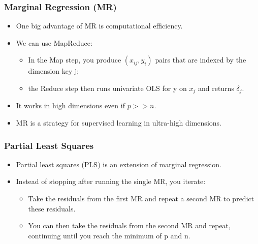 \documentclass[
  shownotes,
  xcolor={svgnames},
  hyperref={colorlinks,citecolor=DarkBlue,linkcolor=DarkRed,urlcolor=DarkBlue}
  , aspectratio=169]{beamer}
\begin{document}
\begin{frame}[fragile]
\frametitle{Marginal Regression (MR)}

\begin{itemize}

\item One big advantage of MR is computational efficiency. 
\medskip
\item We can use MapReduce:
\medskip
\begin{itemize}
\item In the Map step, you produce $(x_{ij}, y_i)$ pairs that are indexed by the dimension key j; 
\medskip
\item the Reduce step then runs univariate OLS for y on $x_j$ and returns $\delta_j$. 
\medskip
\end{itemize}
\item It works in high dimensions even if $p >> n$.
\medskip
\item MR is a strategy for supervised learning in ultra-high dimensions.
\end{itemize} 


\end{frame}
\begin{frame}[fragile]
\frametitle{Partial Least Squares }

\begin{itemize}
\item Partial least squares (PLS) is an extension of marginal regression.
\pause 
\medskip
\item  Instead of stopping after running the single MR, you iterate: 
\medskip
\begin{itemize}
  \item Take the residuals from the first MR and repeat a second MR to predict these residuals. 
  \medskip
  \item You can then take the residuals from the second MR and repeat, continuing until you reach the minimum of p and n. 
\end{itemize}
\end{itemize}
\end{frame}
\end{document}
